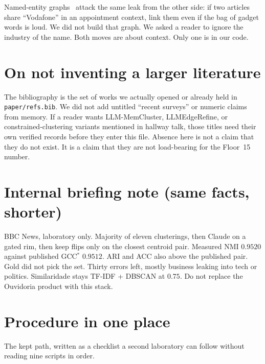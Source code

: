 \documentclass[11pt,a4paper]{article}
\begin{document}
Named-entity graphs~\cite{keraghel2024gcc} attack the same
leak from the other side: if two articles share
``Vodafone'' in an appointment context, link them even if
the bag of gadget words is loud. We did not build that
graph. We asked a reader to ignore the industry of the
name. Both moves are about context. Only one is in our
code.

\section{On not inventing a larger literature}

The bibliography is the set of works we actually opened or
already held in \texttt{paper/refs.bib}. We did not add
untitled ``recent surveys'' or numeric claims from memory.
If a reader wants LLM-MemCluster, LLMEdgeRefine, or
constrained-clustering variants mentioned in hallway talk,
those titles need their own verified records before they
enter this file. Absence here is not a claim that they do
not exist. It is a claim that they are not load-bearing for
the Floor~15 number.

\section{Internal briefing note (same facts, shorter)}

BBC News, laboratory only. Majority of eleven clusterings,
then Claude on a gated rim, then keep flips only on the
closest centroid pair. Measured NMI $0.9520$ against
published GCC$^*$ $0.9512$. ARI and ACC also above the
published pair. Gold did not pick the set. Thirty errors
left, mostly business leaking into tech or politics.
Similaridade stays TF-IDF + DBSCAN at $0.75$. Do not
replace the Ouvidoria product with this stack.

\section{Procedure in one place}

The kept path, written as a checklist a second laboratory can
follow without reading nine scripts in order.
\end{document}
